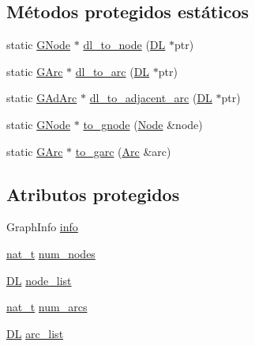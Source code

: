 \subsection*{Métodos protegidos estáticos}
\begin{DoxyCompactItemize}
\item 
static \hyperlink{class_designar_1_1_graph_a7e61951db0bb9bfa8a2e317440d4e17f}{G\+Node} $\ast$ \hyperlink{class_designar_1_1_graph_ab6f1de18d2ec0c537fc1daa5b4a42e01}{dl\+\_\+to\+\_\+node} (\hyperlink{class_designar_1_1_d_l}{DL} $\ast$ptr)
\item 
static \hyperlink{class_designar_1_1_graph_a5ad9e18b71899c2d4979426e367e5573}{G\+Arc} $\ast$ \hyperlink{class_designar_1_1_graph_a543b3279c059a0ee596a56a704ab7825}{dl\+\_\+to\+\_\+arc} (\hyperlink{class_designar_1_1_d_l}{DL} $\ast$ptr)
\item 
static \hyperlink{class_designar_1_1_graph_a7d00558995946c5653522148b54971bc}{G\+Ad\+Arc} $\ast$ \hyperlink{class_designar_1_1_graph_afb508b7f8616948cc46c33deddcfaa4c}{dl\+\_\+to\+\_\+adjacent\+\_\+arc} (\hyperlink{class_designar_1_1_d_l}{DL} $\ast$ptr)
\item 
static \hyperlink{class_designar_1_1_graph_a7e61951db0bb9bfa8a2e317440d4e17f}{G\+Node} $\ast$ \hyperlink{class_designar_1_1_graph_a23038b7502c6fdb53b23453b19579c0e}{to\+\_\+gnode} (\hyperlink{class_designar_1_1_graph_a5dfc7dba9d092ac489c72e40390c37d0}{Node} \&node)
\item 
static \hyperlink{class_designar_1_1_graph_a5ad9e18b71899c2d4979426e367e5573}{G\+Arc} $\ast$ \hyperlink{class_designar_1_1_graph_ab79eb63dd332e483db77da69c1b04522}{to\+\_\+garc} (\hyperlink{class_designar_1_1_graph_a74c730ef4ce2d20f998d72bd25c2b5bf}{Arc} \&arc)
\end{DoxyCompactItemize}
\subsection*{Atributos protegidos}
\begin{DoxyCompactItemize}
\item 
Graph\+Info \hyperlink{class_designar_1_1_graph_a2a8b41ce641ad2fb1b84a4d6b024bb1a}{info}
\item 
\hyperlink{namespace_designar_aa72662848b9f4815e7bf31a7cf3e33d1}{nat\+\_\+t} \hyperlink{class_designar_1_1_graph_a1ff2ba87ab27911b1f6d47e622e67542}{num\+\_\+nodes}
\item 
\hyperlink{class_designar_1_1_d_l}{DL} \hyperlink{class_designar_1_1_graph_a31b0117b6d87816f703a4a5baa1fa6ce}{node\+\_\+list}
\item 
\hyperlink{namespace_designar_aa72662848b9f4815e7bf31a7cf3e33d1}{nat\+\_\+t} \hyperlink{class_designar_1_1_graph_a035a0debf7a7545d0033f37cf941020f}{num\+\_\+arcs}
\item 
\hyperlink{class_designar_1_1_d_l}{DL} \hyperlink{class_designar_1_1_graph_a8c809db7848c78f6718aad466ee959b2}{arc\+\_\+list}
\end{DoxyCompactItemize}
